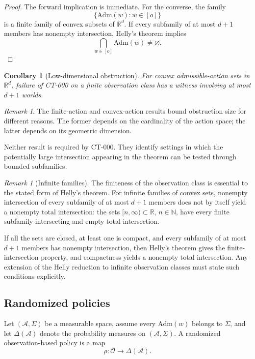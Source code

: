 \documentclass[11pt]{article}
\newtheorem{corollary}[theorem]{Corollary}
\theoremstyle{definition}
\theoremstyle{remark}
\newtheorem{remark}[theorem]{Remark}
\newcommand{\acts}{\mathcal{A}}
\newcommand{\obs}{\mathcal{O}}
\newcommand{\admissible}{\mathrm{Adm}}
\begin{document}
\begin{proof}
The forward implication is immediate. For the converse, the family
\[
  \{\admissible(w):w\in[o]\}
\]
is a finite family of convex subsets of $\mathbb{R}^d$. If every subfamily of
at most $d+1$ members has nonempty intersection, Helly's theorem implies
\[
  \bigcap_{w\in[o]}\admissible(w)
  \neq
  \varnothing.
\]
\end{proof}

\begin{corollary}[Low-dimensional obstruction]
For convex admissible-action sets in $\mathbb{R}^d$, failure of CT-000 on a
finite observation class has a witness involving at most $d+1$ worlds.
\end{corollary}

\begin{remark}
The finite-action and convex-action results bound obstruction size for
different reasons. The former depends on the cardinality of the action space;
the latter depends on its geometric dimension.

Neither result is required by CT-000. They identify settings in which the
potentially large intersection appearing in the theorem can be tested through
bounded subfamilies.
\end{remark}

\begin{remark}[Infinite families]
The finiteness of the observation class is essential to the stated form of
Helly's theorem. For infinite families of convex sets, nonempty intersection
of every subfamily of at most $d+1$ members does not by itself yield a
nonempty total intersection: the sets $[n,\infty)\subset\mathbb{R}$,
$n\in\mathbb{N}$, have every finite subfamily intersecting and empty total
intersection.

If all the sets are closed, at least one is compact, and every subfamily of at
most $d+1$ members has nonempty intersection, then Helly's theorem gives the
finite-intersection property, and compactness yields a nonempty total
intersection. Any extension of the Helly reduction to infinite observation
classes must state such conditions explicitly.
\end{remark}

\subsection{Randomized policies}

Let $(\acts,\Sigma)$ be a measurable space, assume every $\admissible(w)$
belongs to $\Sigma$, and let $\Delta(\acts)$ denote the probability measures
on $(\acts,\Sigma)$. A randomized observation-based policy is a map
\[
  \rho:\obs\to\Delta(\acts).
\]
\end{document}
